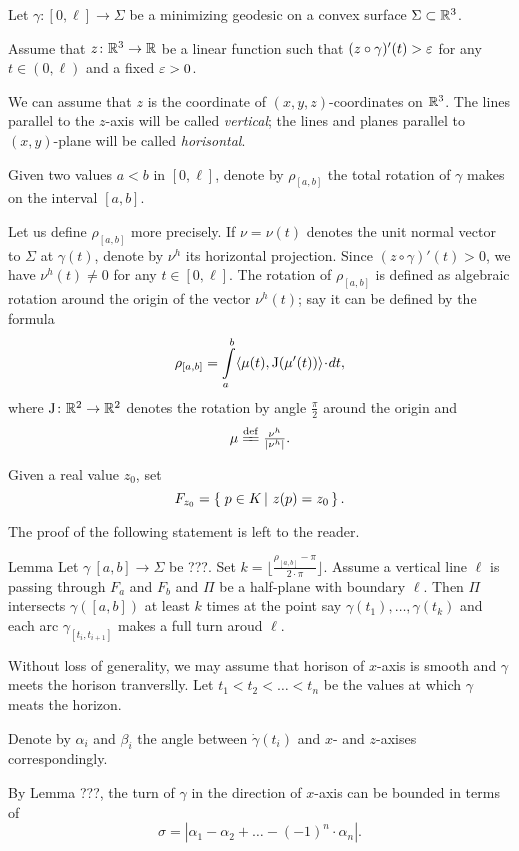 \documentclass[a4paper,10pt]{amsart}
\begin{document}
Let $\gamma:[0,\ell]\to \Sigma$ be a minimizing geodesic on a convex surface $\Sigma\subset \mathbb{R}^3$.

Assume that $z\colon\mathbb{R}^3\to\mathbb{R}$ be a linear function such that
$(z\circ\gamma)'(t)>\varepsilon$ for any $t\in (0,\ell)$ and a fixed $\varepsilon>0$.

We can assume that $z$ is the coordinate 
of $(x,y,z)$-coordinates on $\mathbb{R}^3$.
The lines parallel to the $z$-axis will be called \emph{vertical};
the lines and planes parallel to $(x,y)$-plane will be called \emph{horisontal}.

Given two values $a<b$ in $[0,\ell]$,
denote by $\rho_{[a,b]}$ the total rotation of $\gamma$ makes on the interval $[a,b]$.

Let us define $\rho_{[a,b]}$ more precisely.
If $\nu=\nu(t)$ denotes the unit normal vector to $\Sigma$ at $\gamma(t)$,
denote by $\nu^h$ its horizontal projection.
Since $(z\circ\gamma)'(t)>0$, 
we have $\nu^h(t)\ne0$ for any $t\in [0,\ell]$.
The rotation of $\rho_{[a,b]}$  is defined as
algebraic rotation around the origin of the vector $\nu^h(t)$;
say it can be defined by the formula 
\[\rho_{[a,b]}
=
\int\limits_a^b \<\mu(t),\mathrm{J}(\mu'(t))\>\cdot dt,\]
where $\mathrm{J}\colon\mathbb{R}^2\to\mathbb{R}^2$ denotes the rotation by angle $\tfrac\pi 2$ around the origin and \[\mu\df\tfrac{\nu^h}{|\nu^h|}.\]

Given a real value $z_0$, set 
\[F_{z_0}=\set{p\in K}{z(p)=z_0}.\]

The proof of the following statement is left to the reader.

\begin{thm}{Lemma}
Let $\gamma\:[a,b]\to\Sigma$ be ???.
Set $k=\lfloor \tfrac{\rho_{[a,b]}-\pi}{2\cdot\pi}\rfloor$.
Assume a vertical line $\ell$ is passing through $F_a$ and $F_b$
and $\Pi$ be a half-plane with boundary $\ell$.
Then $\Pi$
intersects $\gamma([a,b])$ at least $k$ times
at the point say $\gamma(t_1), \dots,\gamma(t_k)$
and each arc $\gamma_{[t_i,t_{i+1}]}$ makes a full turn aroud $\ell$.
\end{thm}

Without loss of generality, we may assume that horison of $x$-axis is smooth and $\gamma$ meets the horison tranverslly.
Let $t_1<t_2<\dots<t_n$
be the values at which $\gamma$ meats the horizon.

Denote by $\alpha_i$ and $\beta_i$
the angle between $\dot\gamma(t_i)$ and $x$- and $z$-axises correspondingly.

By Lemma ???, the turn of $\gamma$ in the direction of $x$-axis
can be bounded in terms of 
\[\sigma=|\alpha_1-\alpha_2+\dots-(-1)^n\cdot\alpha_n|.\]
\end{document}
